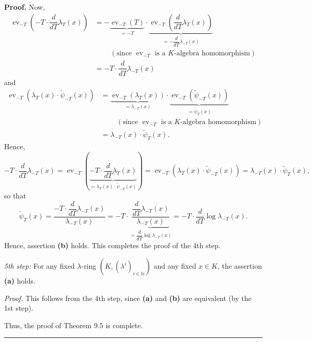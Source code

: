 \documentclass[numbers=enddot,12pt,final,onecolumn,notitlepage]{scrartcl}%
\newenvironment{proof}[1][Proof]{\noindent\textbf{#1.} }{\ \rule{0.5em}{0.5em}}
\begin{document}
\begin{proof}
Now,%
\begin{align*}
\operatorname*{ev}\nolimits_{-T}\left(  -T\cdot\dfrac{d}{dT}\lambda_{T}\left(
x\right)  \right)   &  =-\underbrace{\operatorname*{ev}\nolimits_{-T}\left(
T\right)  }_{=-T}\cdot\underbrace{\operatorname*{ev}\nolimits_{-T}\left(
\dfrac{d}{dT}\lambda_{T}\left(  x\right)  \right)  }_{=-\dfrac{d}{dT}%
\lambda_{-T}\left(  x\right)  }\\
&  \ \ \ \ \ \ \ \ \ \ \left(  \text{since }\operatorname*{ev}\nolimits_{-T}%
\text{ is a }K\text{-algebra homomorphism}\right) \\
&  =-T\cdot\dfrac{d}{dT}\lambda_{-T}\left(  x\right)
\end{align*}
and%
\begin{align*}
\operatorname*{ev}\nolimits_{-T}\left(  \lambda_{T}\left(  x\right)
\cdot\widetilde{\psi}_{-T}\left(  x\right)  \right)   &
=\underbrace{\operatorname*{ev}\nolimits_{-T}\left(  \lambda_{T}\left(
x\right)  \right)  }_{=\lambda_{-T}\left(  x\right)  }\cdot
\underbrace{\operatorname*{ev}\nolimits_{-T}\left(  \widetilde{\psi}%
_{-T}\left(  x\right)  \right)  }_{=\widetilde{\psi}_{T}\left(  x\right)  }\\
&  \ \ \ \ \ \ \ \ \ \ \left(  \text{since }\operatorname*{ev}\nolimits_{-T}%
\text{ is a }K\text{-algebra homomorphism}\right) \\
&  =\lambda_{-T}\left(  x\right)  \cdot\widetilde{\psi}_{T}\left(  x\right)  .
\end{align*}
Hence,%
\[
-T\cdot\dfrac{d}{dT}\lambda_{-T}\left(  x\right)  =\operatorname*{ev}%
\nolimits_{-T}\left(  \underbrace{-T\cdot\dfrac{d}{dT}\lambda_{T}\left(
x\right)  }_{=\lambda_{T}\left(  x\right)  \cdot\widetilde{\psi}_{-T}\left(
x\right)  }\right)  =\operatorname*{ev}\nolimits_{-T}\left(  \lambda
_{T}\left(  x\right)  \cdot\widetilde{\psi}_{-T}\left(  x\right)  \right)
=\lambda_{-T}\left(  x\right)  \cdot\widetilde{\psi}_{T}\left(  x\right)  ,
\]
so that%
\[
\widetilde{\psi}_{T}\left(  x\right)  =\dfrac{-T\cdot\dfrac{d}{dT}\lambda
_{-T}\left(  x\right)  }{\lambda_{-T}\left(  x\right)  }=-T\cdot
\underbrace{\dfrac{\dfrac{d}{dT}\lambda_{-T}\left(  x\right)  }{\lambda
_{-T}\left(  x\right)  }}_{=\dfrac{d}{dT}\log\lambda_{-T}\left(  x\right)
}=-T\cdot\dfrac{d}{dT}\log\lambda_{-T}\left(  x\right)  .
\]
Hence, assertion \textbf{(b)} holds. This completes the proof of the 4th step.

\textit{5th step:} For any fixed $\lambda$-ring $\left(  K,\left(  \lambda
^{i}\right)  _{i\in\mathbb{N}}\right)  $ and any fixed $x\in K$, the assertion
\textbf{(a)} holds.

\textit{Proof.} This follows from the 4th step, since \textbf{(a)} and
\textbf{(b)} are equivalent (by the 1st step).

Thus, the proof of Theorem 9.5 is complete.
\end{proof}
\end{document}
